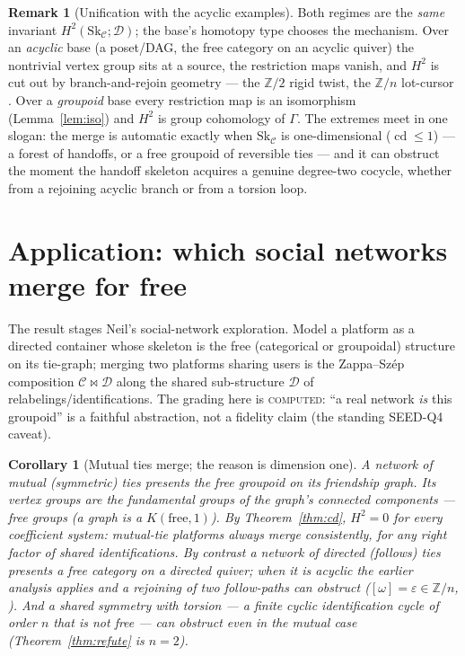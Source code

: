 \documentclass[11pt]{article}
\newtheorem{corollary}[theorem]{Corollary}
\theoremstyle{definition}
\newtheorem{remark}[theorem]{Remark}
\newcommand{\C}{\mathcal{C}}
\newcommand{\D}{\mathcal{D}}
\newcommand{\Sk}{\mathrm{Sk}}
\newcommand{\Z}{\mathbb{Z}}
\newcommand{\cd}{\operatorname{cd}}
\begin{document}
\begin{remark}[Unification with the acyclic examples]\label{rem:unify}
Both regimes are the \emph{same} invariant $H^2(\Sk_\C;\D)$; the base's homotopy
type chooses the mechanism. Over an \emph{acyclic} base (a poset/DAG, the free
category on an acyclic quiver) the nontrivial vertex group sits at a source, the
restriction maps vanish, and $H^2$ is cut out by branch-and-rejoin geometry --- the
$\Z/2$ rigid twist, the $\Z/n$ lot-cursor \cite{gobstr,orch,supply}. Over a
\emph{groupoid} base every restriction map is an isomorphism (Lemma~\ref{lem:iso})
and $H^2$ is group cohomology of $\Gamma$. The extremes meet in one slogan: the
merge is automatic exactly when $\Sk_\C$ is one-dimensional ($\cd\le1$) --- a
forest of handoffs, or a free groupoid of reversible ties --- and it can obstruct
the moment the handoff skeleton acquires a genuine degree-two cocycle, whether from
a rejoining acyclic branch or from a torsion loop.
\end{remark}

\section{Application: which social networks merge for free}\label{sec:social}

The result stages Neil's social-network exploration. Model a platform as a directed
container whose skeleton is the free (categorical or groupoidal) structure on its
tie-graph; merging two platforms sharing users is the Zappa--Sz\'ep composition
$\C\bowtie\D$ along the shared sub-structure $\D$ of relabelings/identifications.
The grading here is \textsc{computed}: ``a real network \emph{is} this
groupoid'' is a faithful abstraction, not a fidelity claim (the standing SEED-Q4
caveat).

\begin{corollary}[Mutual ties merge; the reason is dimension one]\label{cor:social}
A network of \emph{mutual} (symmetric) ties presents the \emph{free groupoid} on its
friendship graph. Its vertex groups are the fundamental groups of the graph's
connected components --- free groups (a graph is a $K(\text{free},1)$). By
Theorem~\ref{thm:cd}, $H^2=0$ for every coefficient system: \emph{mutual-tie
platforms always merge consistently}, for any right factor of shared
identifications. By contrast a network of \emph{directed} (follows) ties presents a
free \emph{category} on a directed quiver; when it is acyclic the earlier analysis
applies and a rejoining of two follow-paths can obstruct
($[\omega]=\varepsilon\in\Z/n$, \cite{orch,supply}). And a shared symmetry with
\emph{torsion} --- a finite cyclic identification cycle of order $n$ that is not
free --- can obstruct even in the mutual case (Theorem~\ref{thm:refute} is $n=2$).
\end{corollary}
\end{document}
